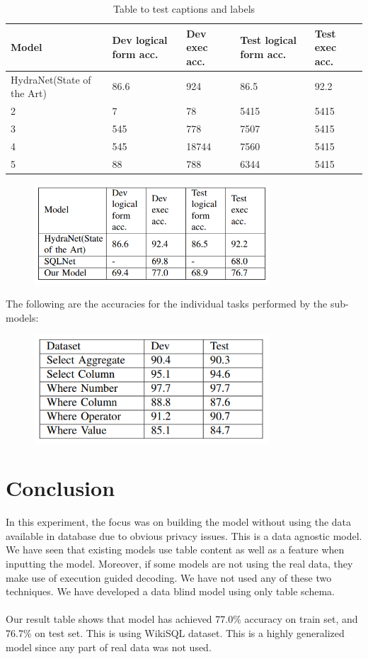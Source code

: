 \documentclass[12pt]{article}
\begin{document}
\begin{table}
\centering
 \begin{tabular}{| m{5cm} | m{2cm}| m{2cm} |m{2cm}| m{2cm} |} 
 \hline
 Model  & Dev logical form acc. & Dev exec acc. & Test logical form acc. & Test exec acc. \\ 
 \hline\hline
 HydraNet(State of the Art) & 86.6 & 924 & 86.5 & 92.2 \\ 
 \hline
 2 & 7 & 78 & 5415  & 5415 \\
 \hline
 3 & 545 & 778 & 7507 & 5415  \\
 \hline
 4 & 545 & 18744 & 7560  & 5415 \\
 \hline
 5 & 88 & 788 & 6344 & 5415  \\ 
 \hline
\end{tabular}
\caption{Table to test captions and labels}
\label{table:1}
\end{table}


\begin{figure}[H]
    \includegraphics[width=250pt]{result1}
    \label{fig:Model Architecture}
\end{figure}

The following are the accuracies for the individual tasks
performed by the sub-models:

\begin{figure}[H]
    \includegraphics[width=250pt]{result2}
    \label{fig:Model Architecture}
\end{figure}

\section{Conclusion}
In this experiment, the focus was on building the model without using the data available in database due to obvious privacy issues. This is a data agnostic model. We have seen that existing models use table content as well as a feature when inputting the model. Moreover, if some models are not using the real data, they make use of execution guided decoding. We have not used any of these two techniques. We have developed a data blind model using only table schema. 
\\
\\
Our result table shows that model has achieved 77.0\% accuracy on train set, and 76.7\% on test set. This is using WikiSQL dataset. This is a highly generalized model since any part of real data was not used. 



\end{document}
